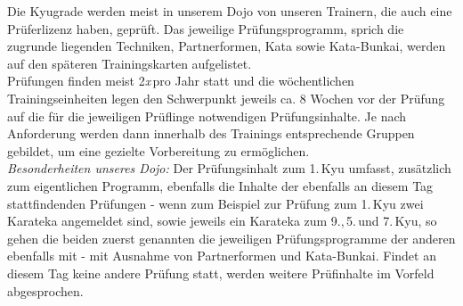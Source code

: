 \begin{center}
{		Die Kyugrade werden meist in unserem Dojo von unseren Trainern, die auch eine Prüferlizenz haben, geprüft. Das jeweilige Prüfungsprogramm, sprich die zugrunde liegenden Techniken, Partnerformen, Kata sowie Kata-Bunkai, werden auf den späteren Trainingskarten aufgelistet.\\
		
		Prüfungen finden meist 2\textit{x}\,pro Jahr statt und die wöchentlichen Trainingseinheiten legen den Schwerpunkt jeweils ca. 8 Wochen vor der Prüfung auf die für die jeweiligen Prüflinge notwendigen Prüfungsinhalte. Je nach Anforderung werden dann innerhalb des Trainings entsprechende Gruppen gebildet, um eine gezielte Vorbereitung zu ermöglichen.\\
		
		\textit{Besonderheiten unseres Dojo:} Der Prüfungsinhalt zum 1.\,Kyu umfasst, zusätzlich zum eigentlichen Programm, ebenfalls die Inhalte der ebenfalls an diesem Tag stattfindenden Prüfungen - wenn zum Beispiel zur Prüfung zum 1.\,Kyu zwei Karateka angemeldet sind, sowie jeweils ein Karateka zum 9.,\,5.\,und 7.\,Kyu, so gehen die beiden zuerst genannten die jeweiligen Prüfungsprogramme der anderen ebenfalls mit - mit Ausnahme von Partnerformen und Kata-Bunkai. Findet an diesem Tag keine andere Prüfung statt, werden weitere Prüfinhalte im Vorfeld abgesprochen.
	}
	\end{center}\null\vfill\null
	\setlength{\tabcolsep}{6pt}